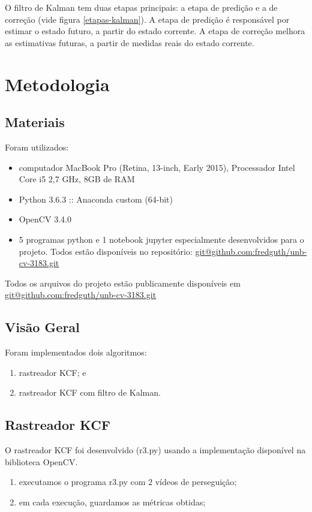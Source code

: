\documentclass[conference]{IEEEtran}
\begin{document}
O filtro de Kalman tem duas etapas principais: a etapa de predição e a de correção (vide figura \ref{etapas-kalman}). A etapa de predição é responsável por estimar o estado futuro, a partir do estado corrente. A etapa de correção melhora as estimativas futuras, a partir de medidas reais do estado corrente. 


\section{Metodologia}\label{metodologia}

\subsection{Materiais}
Foram utilizados:
\begin{itemize}
\item computador MacBook Pro (Retina, 13-inch, Early 2015), Processador Intel Core i5 2,7 GHz, 8GB de RAM
\item Python 3.6.3 :: Anaconda custom (64-bit)
\item OpenCV 3.4.0
\item 5 programas python e 1 notebook jupyter especialmente desenvolvidos para o projeto. Todos estão disponíveis no repositório: \url{git@github.com:fredguth/unb-cv-3183.git}\label{repo}
\end{itemize}
Todos os arquivos do projeto estão publicamente disponíveis em  \url{git@github.com:fredguth/unb-cv-3183.git}\label{repo}

\subsection{Visão Geral}
Foram implementados dois algoritmos:

 \begin{enumerate}
  \item rastreador KCF; e
  \item  rastreador KCF com filtro de Kalman. 
\end{enumerate}

\subsection{Rastreador KCF}

O rastreador KCF foi desenvolvido (r3.py) usando a implementação disponível na biblioteca OpenCV. 
\begin{enumerate}
  \item executamos o programa r3.py com 2 vídeos de perseguição;
  \item em cada execução, guardamos as métricas obtidas;
\end{enumerate}
\end{document}
